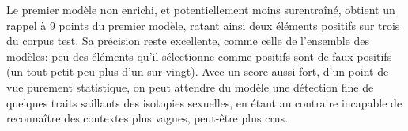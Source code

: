 Le premier modèle non enrichi, et potentiellement moins surentraîné, obtient un rappel à 9 points du premier modèle, ratant ainsi deux éléments positifs sur trois du corpus test. Sa précision reste excellente, comme celle de l'ensemble des modèles: peu des éléments qu'il sélectionne comme positifs sont de faux positifs (un tout petit peu plus d'un sur vingt). Avec un score aussi fort, d'un point de vue purement statistique, on peut attendre du modèle une détection fine de quelques traits saillants des isotopies sexuelles, en étant au contraire incapable de reconnaître des contextes plus vagues, peut-être plus crus. 

\noindent\begin{minipage}{\linewidth}%
    \resizebox{\linewidth}{!}{%
    \begin{tabular}{r|lllll|rrr}
    \toprule
     Index & Morphologie & Encodeur & Enrichissement & Embeddings & Taille encodée &  Précision &  Rappel &  Score F1 \\
    \midrule
        19 &             &  MeanMax &         Linear &       BERT &            256 &      90.20 &   \textbf{42.05} &     \textbf{57.36} \\
        18 &             &      GRU &         Linear &       BERT &            256 &      92.17 &   36.49 &     52.28 \\
        17 &             &     LSTM &           LSTM &   FastText &            256 &      96.56 &   35.08 &     51.34 \\
        16 &             &      HAN &         Linear &   Word2Vec &            128 &      96.17 &   33.79 &     49.98 \\
        15 &             &     LSTM &           LSTM &   FastText &            128 &      \textbf{97.32} &   33.23 &     49.56 \\
        14 &  Agglomérée &      GRU &                &   Word2Vec &            256 &      94.87 &   \textbf{33.11} &     \textbf{49.05} \\
        13 &  Agglomérée &     LSTM &                &   Word2Vec &            256 &      95.36 &   32.77 &     48.71 \\
        12 &  Agglomérée &     LSTM &           LSTM &   Word2Vec &            128 &      95.01 &   30.31 &     45.91 \\
        11 &             &      HAN &         Linear &       BERT &            256 &      94.27 &   30.09 &     45.61 \\
        10 &  Agglomérée &      HAN &                &   Word2Vec &            256 &      95.98 &   29.39 &     45.02 \\

\end{tabular}}
\end{minipage}
